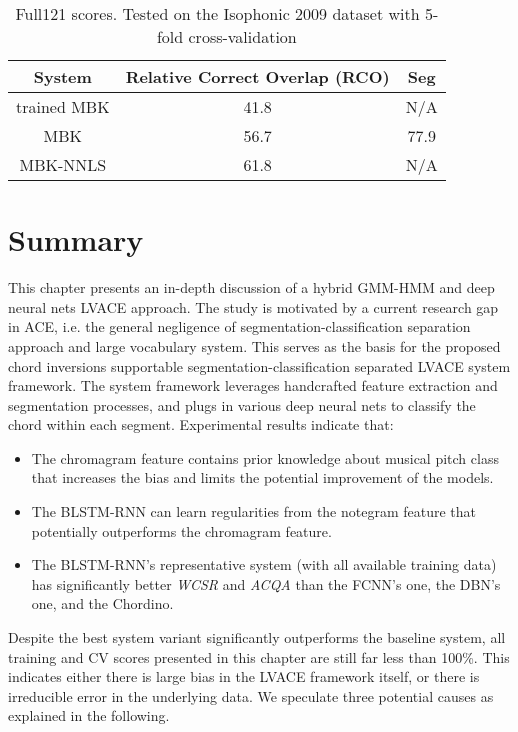 \begin{table}[h]
\footnotesize
\centering
\caption{Full121 scores. Tested on the Isophonic 2009 dataset with 5-fold cross-validation \cite{mauch2010automatic}}
\label{tab:3-fullmbk}
\begin{tabular}{|c|c|c|}\hline
System & Relative Correct Overlap (RCO) & Seg \\ \hline
trained MBK & 41.8 & N/A \\ \hline
MBK & 56.7 & 77.9 \\ \hline
MBK-NNLS & 61.8 & N/A \\ \hline
\end{tabular}
\end{table}


\section{Summary} \label{sec:3-concln}
This chapter presents an in-depth discussion of a hybrid GMM-HMM and deep neural nets LVACE approach. The study is motivated by a current research gap in ACE, i.e. the general negligence of segmentation-classification separation approach and large vocabulary system. This serves as the basis for the proposed chord inversions supportable segmentation-classification separated LVACE system framework. The system framework leverages handcrafted feature extraction and segmentation processes, and plugs in various deep neural nets to classify the chord within each segment. Experimental results indicate that:
\begin{itemize}
	\item The chromagram feature contains prior knowledge about musical pitch class that increases the bias and limits the potential improvement of the models.
	\item The BLSTM-RNN can learn regularities from the notegram feature that potentially outperforms the chromagram feature.
	\item The BLSTM-RNN's representative system (with all available training data) has significantly better \textit{WCSR} and \textit{ACQA} than the FCNN's one, the DBN's one, and the Chordino.
\end{itemize}

Despite the best system variant significantly outperforms the baseline system, all training and CV scores presented in this chapter are still far less than 100\%. This indicates either there is large bias in the LVACE framework itself, or there is irreducible error in the underlying data. We speculate three potential causes as explained in the following.

